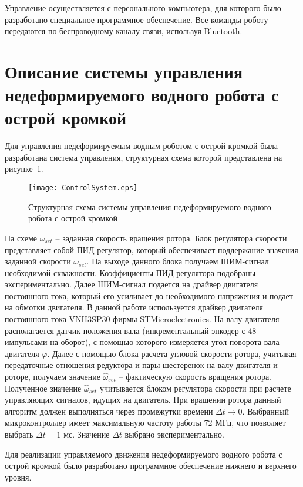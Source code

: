 Управление осуществляется с персонального компьютера, для которого было разработано специальное программное обеспечение. Все команды роботу передаются по беспроводному каналу связи, используя Bluetooth.


\section{Описание системы управления недеформируемого водного робота с острой кромкой}

Для управления недеформируемым водным роботом с острой кромкой была разработана система управления, структурная схема которой представлена на рисунке~\ref{ControlSystem}.

\begin{figure}[!h]
	\centering
	\texttt{[image: ControlSystem.eps]}
	\caption{Структурная схема системы управления недеформируемого водного робота с острой кромкой}
	\label{ControlSystem}
\end{figure}

На схеме $ \omega_{set} $ -- заданная скорость вращения ротора. Блок регулятора скорости представляет собой ПИД-регулятор, который обеспечивает поддержание значения заданной скорости $ \omega_{set} $. На выходе данного блока получаем ШИМ-сигнал необходимой скважности. Коэффициенты ПИД-регулятора подобраны экспериментально. Далее ШИМ-сигнал подается на драйвер двигателя постоянного тока, который его усиливает до необходимого напряжения и подает на обмотки двигателя. В данной работе используется драйвер двигателя постоянного тока VNH3SP30 фирмы STMicroelectronics. На валу двигателя располагается датчик положения вала (инкрементальный энкодер с 48 импульсами на оборот), с помощью которого измеряется угол поворота вала двигателя $ \varphi $. Далее с помощью блока расчета угловой скорости ротора, учитывая передаточные отношения редуктора и пары шестеренок на валу двигателя и роторе, получаем значение $ \hat{\omega}_{set} $ -- фактическую скорость вращения ротора. Полученное значение $ \hat{\omega}_{set} $ учитывается блоком регулятора скорости при расчете управляющих сигналов, идущих на двигатель. При вращении ротора данный алгоритм должен выполняться через промежутки времени $ \Delta t \rightarrow 0 $. Выбранный микроконтроллер имеет максимальную частоту работы 72 МГц, что позволяет выбрать $ \Delta t = 1 $ мс. Значение $ \Delta t $ выбрано экспериментально.

Для реализации управляемого движения недеформируемого водного робота с острой кромкой было разработано программное обеспечение нижнего и верхнего уровня.

